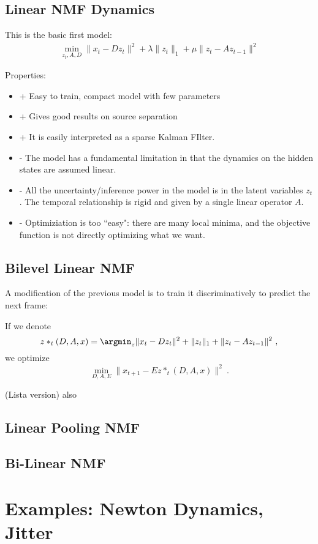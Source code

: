 \documentclass[11pt]{article} %
\begin{document}
\subsection{Linear NMF Dynamics}

This is the basic first model:
\begin{eqnarray}
\min_{z_t, A, D} \| x_t - D z_t \|^2 + \lambda \|z_t \|_1 + \mu \|z_t - A z_{t-1} \|^2
\end{eqnarray}

Properties:
\begin{itemize}
\item + Easy to train, compact model with few parameters
\item + Gives good results on source separation
\item + It is easily interpreted as a sparse Kalman FIlter.
\item - The model has a fundamental limitation in that the dynamics on the hidden states are assumed linear. 
\item - All the uncertainty/inference power in the model is in the latent variables $z_t$. The temporal relationship is rigid and given by
a single linear operator $A$.
\item - Optimiziation is too ``easy": there are many local minima, and the objective function is not directly optimizing what we want.
\end{itemize}

\subsection{Bilevel Linear NMF}

A modification of the previous model is to train it discriminatively to predict the next frame:

If we denote 
$$z*_t(D, A, x) = \argmin_z \| x_t - D z_t \|^2 + \|z_t \|_1 +  \| z_t - A z_{t-1} \|^2~,$$
we optimize
$$\min_{D, A, E} \| x_{t+1} - E z*_t(D, A, x) \|^2~.$$

(Lista version) also 


\subsection{Linear Pooling NMF}

\subsection{Bi-Linear NMF}

\section{Examples: Newton Dynamics, Jitter}
\end{document}
